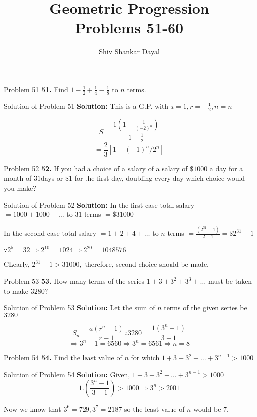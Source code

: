 \documentclass[aspectratio=1610,8pt]{beamer}
\title{Geometric Progression\\Problems 51-60}
\author[Shiv Shankar Dayal]{Shiv Shankar Dayal}
\begin{document}
\begin{frame}
       \titlepage
\end{frame}
\begin{frame}{Problem 51}
  \textbf{51.} Find $1 - \frac{1}{2} + \frac{1}{4} - \frac{1}{8}$ to $n$ terms.
\end{frame}
\begin{frame}{Solution of Problem 51}
  \textbf{Solution:} This is a G.P. with $a = 1, r = -\frac{1}{2}, n = n$

  $$S = \frac{1\left(1 - \frac{1}{(-2)^n}\right)}{1 + \frac{1}{2}}$$
  $$= \frac{2}{3}[1 - (-1)^n/2^n]$$
\end{frame}
\begin{frame}{Problem 52}
  \textbf{52.} If you had a choice of a salary of a salary of $\$ 1000$ a day for a month of $31$days or $\$ 1$ for the first day,
  doubling every day which choice would you make?
\end{frame}
\begin{frame}{Solution of Problem 52}
  \textbf{Solution:} In the first case total salary $= 1000 + 1000 + \ldots$ to $31$ terms $= \$ 31000$

  In the second case total salary $= 1 + 2 + 4 + \ldots$ to $n$ terms $= \frac{(2^{31} - 1)}{2 - 1} =\$ 2^{31} - 1$

  $\because 2^5 = 32\Rightarrow 2^{10} = 1024\Rightarrow 2^{20} = 1048576$

  CLearly, $2^{31} - 1 > 31000,$ therefore, second choice should be made.
\end{frame}
\begin{frame}{Problem 53}
  \textbf{53.} How many terms of the series $1 + 3 + 3^2 + 3^3 + \ldots$ must be taken to make $3280$?
\end{frame}
\begin{frame}{Solution of Problem 53}
  \textbf{Solution:} Let the sum of $n$ terms of the given series be $3280$

  $$S_n = \frac{a(r^n - 1)}{r - 1}\therefore 3280 = \frac{1(3^n - 1)}{3 - 1}$$
  $$\Rightarrow 3^n - 1 = 6560 \Rightarrow 3^n = 6561 \Rightarrow n = 8$$
\end{frame}
\begin{frame}{Problem 54}
  \textbf{54.} Find the least value of $n$ for which $1 + 3 + 3^2 + \ldots + 3^{n - 1} > 1000$
\end{frame}
\begin{frame}{Solution of Problem 54}
  \textbf{Solution:} Given, $1 + 3 + 3^2 + \ldots + 3^{n - 1} > 1000$
  $$1.\left(\frac{3^n - 1}{3 - 1}\right) > 1000 \Rightarrow 3^n > 2001$$

  Now we know that $3^6 = 729, 3^7 = 2187$ so the least value of $n$ would be $7.$
\end{frame}
\end{document}
